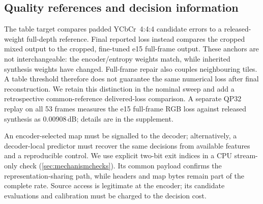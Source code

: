 \subsection{Quality references and decision information}

The table target compares padded YCbCr~4:4:4 candidate errors to a released-weight
full-depth reference. Final reported loss instead compares the cropped mixed
output to the cropped, fine-tuned e15 full-frame output. These anchors are
not interchangeable: the encoder/entropy weights match, while inherited
synthesis weights have changed. Full-frame repair also couples neighbouring
tiles. A table threshold therefore does not guarantee the same numerical
loss after final reconstruction. We retain this distinction in the nominal
sweep and add a retrospective common-reference delivered-loss comparison.
A separate QP32 replay on all 53 frames measures the e15 full-frame RGB loss
against released synthesis as 0.00908\,dB; details are in the supplement.

An encoder-selected map must be signalled to the decoder; alternatively,
a decoder-local predictor must recover the same decisions from available
features and a reproducible control. We use explicit two-bit exit indices
in a CPU stream-only check (\cref{sec:mechanismchecks}). Its common payload
confirms the representation-sharing path, while headers and map bytes remain
part of the complete rate. Source access is legitimate at the encoder;
its candidate evaluations and calibration must be charged to the decision
cost.

